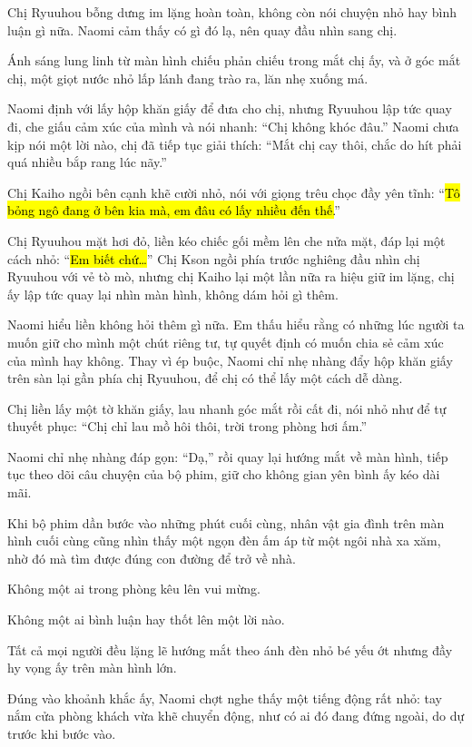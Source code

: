 \documentclass[../main.tex]{subfiles}
\begin{document}
Chị Ryuuhou bỗng dưng im lặng hoàn toàn, không còn nói chuyện nhỏ hay bình luận gì nữa. Naomi cảm thấy có gì đó lạ, nên quay đầu nhìn sang chị.

Ánh sáng lung linh từ màn hình chiếu phản chiếu trong mắt chị ấy, và ở góc mắt chị, một giọt nước nhỏ lấp lánh đang trào ra, lăn nhẹ xuống má. 

Naomi định với lấy hộp khăn giấy để đưa cho chị, nhưng Ryuuhou lập tức quay đi, che giấu cảm xúc của mình và nói nhanh: ``Chị không khóc đâu.'' Naomi chưa kịp nói một lời nào, chị đã tiếp tục giải thích: ``Mắt chị cay thôi, chắc do hít phải quá nhiều bắp rang lúc nãy.''

Chị Kaiho ngồi bên cạnh khẽ cười nhỏ, nói với giọng trêu chọc đầy yên tĩnh: ``\hl{Tô bỏng ngô đang ở bên kia mà, em đâu có lấy nhiều đến thế.}''

Chị Ryuuhou mặt hơi đỏ, liền kéo chiếc gối mềm lên che nửa mặt, đáp lại một cách nhỏ: ``\hl{Em biết chứ\dots}'' Chị Kson ngồi phía trước nghiêng đầu nhìn chị Ryuuhou với vẻ tò mò, nhưng chị Kaiho lại một lần nữa ra hiệu giữ im lặng, chị ấy lập tức quay lại nhìn màn hình, không dám hỏi gì thêm.

Naomi hiểu liền không hỏi thêm gì nữa. Em thấu hiểu rằng có những lúc người ta muốn giữ cho mình một chút riêng tư, tự quyết định có muốn chia sẻ cảm xúc của mình hay không. Thay vì ép buộc, Naomi chỉ nhẹ nhàng đẩy hộp khăn giấy trên sàn lại gần phía chị Ryuuhou, để chị có thể lấy một cách dễ dàng. 

Chị liền lấy một tờ khăn giấy, lau nhanh góc mắt rồi cất đi, nói nhỏ như để tự thuyết phục: ``Chị chỉ lau mồ hôi thôi, trời trong phòng hơi ấm.'' 

Naomi chỉ nhẹ nhàng đáp gọn: ``Dạ,'' rồi quay lại hướng mắt về màn hình, tiếp tục theo dõi câu chuyện của bộ phim, giữ cho không gian yên bình ấy kéo dài mãi.

\ct

Khi bộ phim dần bước vào những phút cuối cùng, nhân vật gia đình trên màn hình cuối cùng cũng nhìn thấy một ngọn đèn ấm áp từ một ngôi nhà xa xăm, nhờ đó mà tìm được đúng con đường để trở về nhà.

Không một ai trong phòng kêu lên vui mừng.

Không một ai bình luận hay thốt lên một lời nào.

Tất cả mọi người đều lặng lẽ hướng mắt theo ánh đèn nhỏ bé yếu ớt nhưng đầy hy vọng ấy trên màn hình lớn.

Đúng vào khoảnh khắc ấy, Naomi chợt nghe thấy một tiếng động rất nhỏ: tay nắm cửa phòng khách vừa khẽ chuyển động, như có ai đó đang đứng ngoài, do dự trước khi bước vào.
\end{document}
